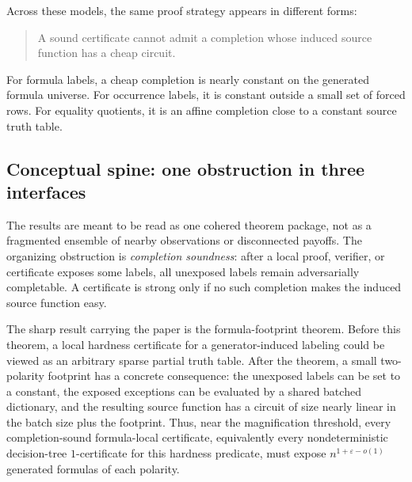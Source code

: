 \documentclass[11pt]{article}
\theoremstyle{definition}
\newcommand{\eps}{\varepsilon}
\begin{document}
Across these models, the same proof strategy appears in different forms:

\begin{quote}
A sound certificate cannot admit a completion whose induced source function has a cheap circuit.
\end{quote}

For formula labels, a cheap completion is nearly constant on the generated formula universe.  For occurrence labels, it is constant outside a small set of forced rows.  For equality quotients, it is an affine completion close to a constant source truth table.

\subsection{Conceptual spine: one obstruction in three interfaces}

The results are meant to be read as one cohered theorem package, not as a fragmented ensemble of nearby observations or disconnected payoffs.  The organizing obstruction is \emph{completion soundness}: after a local proof, verifier, or certificate exposes some labels, all unexposed labels remain adversarially completable.  A certificate is strong only if no such completion makes the induced source function easy.

The sharp result carrying the paper is the formula-footprint theorem.  Before this theorem, a local hardness certificate for a generator-induced labeling could be viewed as an arbitrary sparse partial truth table.  After the theorem, a small two-polarity footprint has a concrete consequence: the unexposed labels can be set to a constant, the exposed exceptions can be evaluated by a shared batched dictionary, and the resulting source function has a circuit of size nearly linear in the batch size plus the footprint.  Thus, near the magnification threshold, every completion-sound formula-local certificate, equivalently every nondeterministic decision-tree \(1\)-certificate for this hardness predicate, must expose \(n^{1+\eps-o(1)}\) generated formulas of each polarity.
\end{document}
